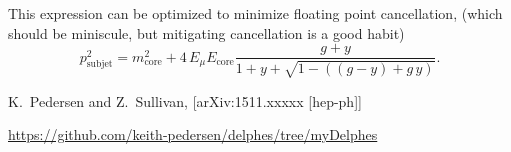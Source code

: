 \documentclass[10pt]{article}
\newcommand{\pSubjet}[1][] {p_{\mathrm{subjet}}^{#1}}
\newcommand{\mCore}[1][]     {m_{\mathrm{core}}^{#1}}
\newcommand{\ECore}[1][]     {E_{\mathrm{core}}^{#1}}
\newcommand{\EMu}[1][]       {E_{\mu}^{#1}}
\begin{document}
This expression can be optimized to minimize floating point cancellation,
(which should be miniscule, but mitigating cancellation is a good habit)
%
\begin{equation}
\pSubjet[2]=\mCore[2]+4\,\EMu\ECore\frac{g+y}{1+y+\sqrt{1-((g-y)+g\,y)}}.
\end{equation}

\begin{thebibliography}{}

	K.~Pedersen and Z.~Sullivan,
	[arXiv:1511.xxxxx [hep-ph]]

	\url{https://github.com/keith-pedersen/delphes/tree/myDelphes}

\end{thebibliography}
\end{document}
